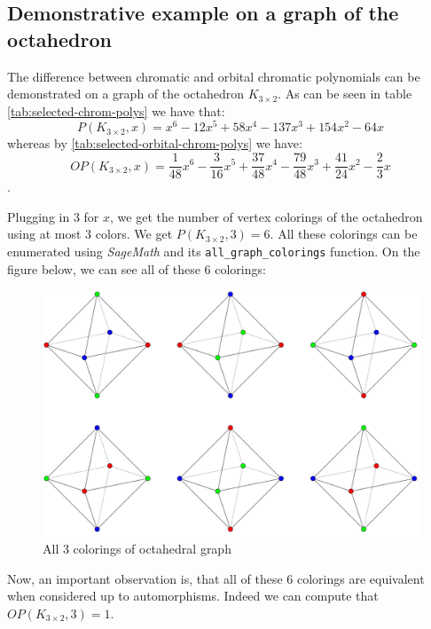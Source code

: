 \subsection{Demonstrative example on a graph of the octahedron}

The difference between chromatic and orbital chromatic polynomials can be demonstrated on a graph of the octahedron $K_{3 \times 2}$. As can be seen in table \ref{tab:selected-chrom-polys} we have that: $$P(K_{3 \times 2},x) = x^{6} - 12x^{5} + 58x^{4} - 137x^{3} + 154x^{2} - 64x$$ whereas by \ref{tab:selected-orbital-chrom-polys} 
 we have: $$OP(K_{3 \times 2},x) = \frac{1}{48}x^{6} - \frac{3}{16}x^{5} + \frac{37}{48}x^{4} - \frac{79}{48}x^{3} + \frac{41}{24}x^{2} - \frac{2}{3}x$$.

Plugging in $3$ for $x$, we get the number of vertex colorings of the octahedron using at most $3$ colors. We get $P(K_{3 \times 2},3) = 6$. All these colorings can be enumerated using \textit{SageMath} \cite{sagemath} and its \verb|all_graph_colorings| function. On the figure below, we can see all of these $6$ colorings:

\begin{figure}[H]
    \centering
    \includegraphics[width=1\textwidth]{../Resources/Figs/octahedron_3-clrings.pdf}
    \caption{All 3 colorings of octahedral graph}
    \label{fig:octahedron-3-clrings}
\end{figure}

Now, an important observation is, that all of these $6$ colorings are equivalent when considered up to automorphisms. Indeed we can compute that $OP(K_{3 \times 2},3) = 1$.


